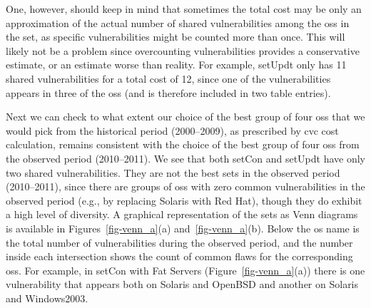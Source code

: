 One, however, should keep in mind that sometimes the total cost may be only an approximation of the actual number of shared vulnerabilities among the \glspl{os} in the set, as specific vulnerabilities might be counted more than once. 
This will likely not be a problem since overcounting vulnerabilities provides a conservative estimate, or an estimate worse than reality. 
For example, setUpdt only has 11 shared vulnerabilities for a total cost of 12, since one of the vulnerabilities appears in three of the \glspl{os} (and is therefore included in two table entries).

Next we can check to what extent our choice of the best group of four \glspl{os} that we would pick from the historical period (2000--2009), as prescribed by \gls{cvc} cost calculation, remains consistent with the choice of the best group of four \glspl{os} from the observed period (2010--2011). 
We see that both setCon and setUpdt have only two shared vulnerabilities. 
They are not the best sets in the observed period (2010--2011), since there are groups of \glspl{os} with zero common vulnerabilities in the observed period (e.g., by replacing Solaris with Red Hat), though they do exhibit a high level of diversity. 
A graphical representation of the sets as Venn diagrams is available in Figures~\ref{fig-venn_a}(a) and~\ref{fig-venn_a}(b). 
Below the \gls{os} name is the total number of vulnerabilities during the observed period, and the number inside each intersection shows the count of common flaws for the corresponding \glspl{os}. 
For example, in setCon with Fat Servers (Figure~\ref{fig-venn_a}(a)) there is one vulnerability that appears both on Solaris and OpenBSD and another on Solaris and Windows2003.


